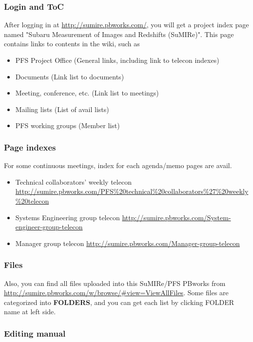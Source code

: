 \documentclass[a4paper,notitlepage]{article}
\begin{document}
\subsubsection{Login and ToC}

After logging in at \url{http://sumire.pbworks.com/}, 
you will get a project index page named 
"Subaru Measurement of Images and Redshifts (SuMIRe)". 
This page contains links to contents in the wiki, such as 

\begin{itemize}
  \item PFS Project Office (General links, including link to telecon indexes)
  \item Documents (Link list to documents)
  \item Meeting, conference, etc.  (Link list to meetings)
  \item Mailing lists (List of avail lists)
  \item PFS working groups (Member list)
\end{itemize}

\subsubsection{Page indexes}

For some continuous meetings, index for each agenda/memo pages are avail.

\begin{itemize}
  \item Technical collaborators' weekly telecon \url{http://sumire.pbworks.com/PFS%20technical%20collaborators%27%20weekly%20telecon}
  \item Systems Engineering group telecon \url{http://sumire.pbworks.com/System-engineer-group-telecon}
  \item Manager group telecon \url{http://sumire.pbworks.com/Manager-group-telecon}
\end{itemize}


\subsubsection{Files}

Also, you can find all files uploaded into this SuMIRe/PFS PBworks from 
\url{http://sumire.pbworks.com/w/browse/#view=ViewAllFiles}.
Some files are categorized into {\bf FOLDERS}, and you can get each list by 
clicking FOLDER name at left side. 

\subsubsection{Editing manual}
\end{document}
